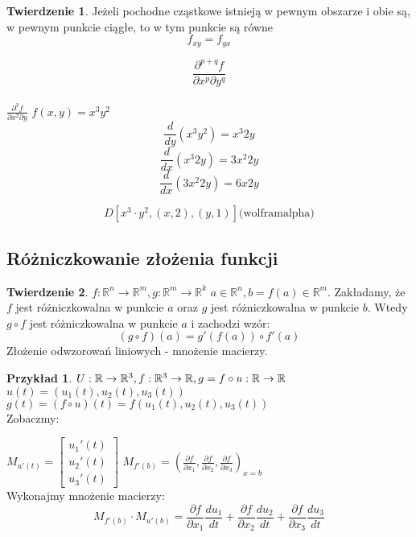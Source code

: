 \documentclass{article}
\theoremstyle{definition}
\theoremstyle{definition}
\newtheorem{tw}{Twierdzenie}[subsection]
\theoremstyle{definition}
\newtheorem{pk}{Przykład}[subsection]
\theoremstyle{definition}
\begin{document}
\begin{tw}
  Jeżeli pochodne cząstkowe istnieją w pewnym obszarze i obie są, w pewnym punkcie ciągłe, to w tym punkcie są równe
  \[ f_{xy} = f_{yx} \]
\end{tw}

\[\frac{\partial^{p+q} f}{\partial x^p \partial y^q}\]\\

$\frac{\partial^3 f}{\partial x^2 \partial y}$
$f(x,y) = x^3 y^2$\\

\[\frac{d}{dy} (x^3 y^2) = x^3 2y\]
\[\frac{d}{dx} (x^3 2y) = 3x^2 2y\]
\[\frac{d}{dx} (3x^2 2y) = 6x 2y\]

\[D\left[x^3 \cdot y^2, (x,2), (y,1)\right] \text {(wolframalpha)}\]

\subsection{Różniczkowanie złożenia funkcji}

\begin{tw}
    $f:\mathbb{R}^n \rightarrow \mathbb{R}^m, g: \mathbb{R}^m \rightarrow \mathbb{R}^k$ 
    $a\in\mathbb{R}^n, b=f(a)\in \mathbb{R}^m$. Zakładamy, że $f$ jest różniczkowalna w punkcie $a$
    oraz $g$ jest różniczkowalna w punkcie $b$. Wtedy $g\circ f$ jest różniczkowalna w punkcie $a$ i zachodzi wzór:
    \[(g\circ f)(a) = g'\left(f(a)\right) \circ f'(a)\]
    Złożenie odwzorowań liniowych - mnożenie macierzy.
\end{tw}

\begin{pk}
    $U: \mathbb{R} \rightarrow \mathbb{R}^3, f: \mathbb{R}^3 \rightarrow \mathbb{R}, g=f\circ u : \mathbb{R} \rightarrow \mathbb{R}\\$
    $u(t) = \left(u_1 (t), u_2 (t), u_3 (t)\right)$\\
    $g(t) = (f\circ u) (t) = f(u_1(t),u_2(t),u_3(t))$\\
    Zobaczmy:

    $M_{u'(t)} = \begin{bmatrix}
        u_1'(t) \\
        u_2'(t) \\
        u_3'(t)
    \end{bmatrix}  
    $
    $M_{f'(b)} = \left(\frac{\partial f}{\partial x_1}, \frac{\partial f}{\partial x_2}, \frac{\partial f}{\partial x_3}\right)_{x=b}$\\
    Wykonajmy mnożenie macierzy:
    \[M_{f'(b)}\cdot M_{u'(b)} = \frac{\partial f}{\partial x_1} \frac{d u_1}{dt} + \frac{\partial f}{\partial x_2} \frac{d u_2}{dt} + \frac{\partial f}{\partial x_3} \frac{d u_3}{dt}\]
\end{pk}
\end{document}
